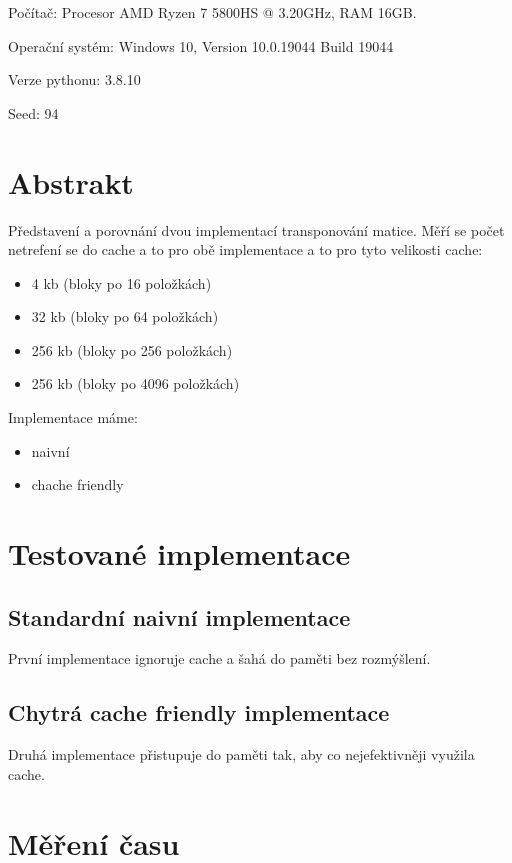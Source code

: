\documentclass[a4paper]{article}
\author{David Napravnik}
\begin{document}
  \pagestyle{fancy}

	Počítač: Procesor AMD Ryzen 7 5800HS @ 3.20GHz, RAM 16GB.
	
	Operační systém: Windows 10, Version 10.0.19044 Build 19044
	
	Verze pythonu: 3.8.10

    Seed: 94

	\section{Abstrakt}
	Představení a porovnání dvou implementací transponování matice.
	Měří se počet netrefení se do cache a to pro obě implementace a to pro tyto velikosti cache:
	\begin{itemize}
		\item 4 kb (bloky po 16 položkách)
		\item 32 kb (bloky po 64 položkách)
		\item 256 kb (bloky po 256 položkách)	
		\item 256 kb (bloky po 4096 položkách)	
	\end{itemize}
	Implementace máme:
	\begin{itemize}
		\item naivní
		\item chache friendly
	\end{itemize}
	
	\section{Testované implementace}

	\subsection{Standardní naivní implementace}

	První implementace ignoruje cache a šahá do paměti bez rozmýšlení.

	\subsection{Chytrá cache friendly implementace}

	Druhá implementace přistupuje do paměti tak, aby co nejefektivněji využila cache.
	

	\section{Měření času}
\end{document}
